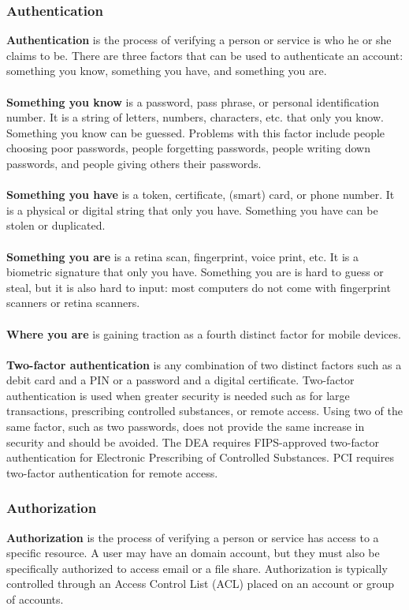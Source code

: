 \subsubsection{Authentication}\label{subsubsec:"Authentication"}\textbf{Authentication} is the process of verifying a person or service is who he or she claims to be. There are three factors that can be used to authenticate an account: something you know, something you have, and something you are.\\\\
\textbf{Something you know} is a password, pass phrase, or personal identification number. It is a string of letters, numbers, characters, etc. that only you know. Something you know can be guessed. Problems with this factor include people choosing poor passwords, people forgetting passwords, people writing down passwords, and people giving others their passwords.\\\\
\textbf{Something you have} is a token, certificate, (smart) card, or phone number. It is a physical or digital string that only you have. Something you have can be stolen or duplicated.\\\\
\textbf{Something you are} is a retina scan, fingerprint, voice print, etc. It is a biometric signature that only you have. Something you are is hard to guess or steal, but it is also hard to input: most computers do not come with fingerprint scanners or retina scanners.\\\\
\textbf{Where you are} is gaining traction as a fourth distinct factor for mobile devices.\\\\
\textbf{Two-factor authentication} is any combination of two distinct factors such as a debit card and a PIN or a password and a digital certificate. Two-factor authentication is used when greater security is needed such as for large transactions, prescribing controlled substances, or remote access. Using two of the same factor, such as two passwords, does not provide the same increase in security and should be avoided. The DEA requires FIPS-approved two-factor authentication for Electronic Prescribing of Controlled Substances. PCI requires two-factor authentication for remote access.
\subsubsection{Authorization}\textbf{Authorization} is the process of verifying a person or service has access to a specific resource. A user may have an domain account, but they must also be specifically authorized to access email or a file share. Authorization is typically controlled through an Access Control List (ACL) placed on an account or group of accounts.
